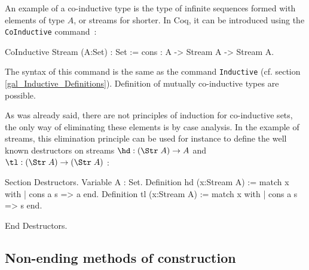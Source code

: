 An example of a co-inductive type is the type of infinite sequences formed with
elements of type $A$, or streams for shorter. In Coq, 
it can be introduced using the \verb!CoInductive! command~:
\begin{coq_example}
CoInductive Stream (A:Set) : Set :=
    cons : A -> Stream A -> Stream A.
\end{coq_example}

The syntax of this command is the same as the 
command \verb!Inductive! (cf. section
\ref{gal_Inductive_Definitions}).
Definition of mutually co-inductive types are possible.

As was already said, there are not principles of 
induction for co-inductive sets, the only way of eliminating these
elements is by case analysis. 
In the example of streams, this elimination principle can be
used for instance to define the well known 
destructors on streams $\hd : (\Str\;A)\rightarrow A$ 
and $\tl: (\Str\;A)\rightarrow (\Str\;A)$  :
\begin{coq_example}
Section Destructors.
Variable A : Set.
Definition hd (x:Stream A) := match x with
                              | cons a s => a
                              end.
Definition tl (x:Stream A) := match x with
                              | cons a s => s
                              end.
\end{coq_example}
\begin{coq_example*}
End Destructors.
\end{coq_example*}

\subsection{Non-ending methods of construction}

